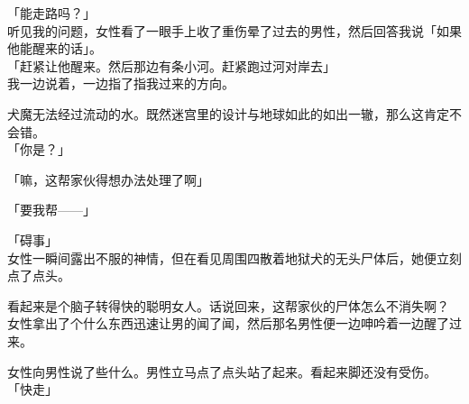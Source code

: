「能走路吗？」\\

听见我的问题，女性看了一眼手上收了重伤晕了过去的男性，然后回答我说「如果他能醒来的话」。\\

「赶紧让他醒来。然后那边有条小河。赶紧跑过河对岸去」\\

我一边说着，一边指了指我过来的方向。

犬魔无法经过流动的水。既然迷宫里的设计与地球如此的如出一辙，那么这肯定不会错。\\

「你是？」

「嘛，这帮家伙得想办法处理了啊」

「要我帮——」

「碍事」\\

女性一瞬间露出不服的神情，但在看见周围四散着地狱犬的无头尸体后，她便立刻点了点头。

看起来是个脑子转得快的聪明女人。话说回来，这帮家伙的尸体怎么不消失啊？\\

女性拿出了个什么东西迅速让男的闻了闻，然后那名男性便一边呻吟着一边醒了过来。

女性向男性说了些什么。男性立马点了点头站了起来。看起来脚还没有受伤。\\

「快走」\\

